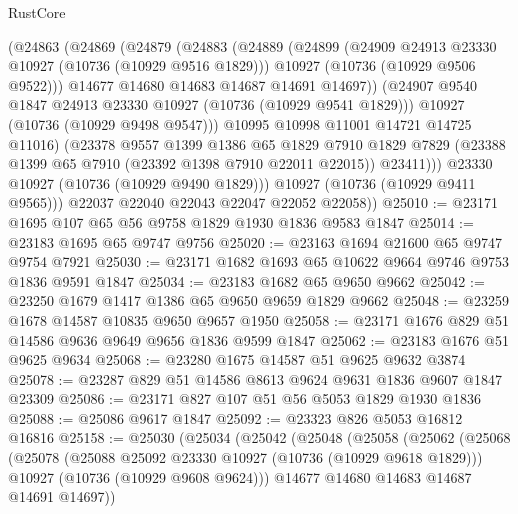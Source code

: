 \begin{lexlean}{RustCore}
\begin{coremodule}
              (@24863
                (@24869
                  (@24879
                    (@24883
                      (@24889
                        (@24899
                          (@24909 @24913 @23330 @10927 (@10736 (@10929 @9516 @1829)))
                          @10927
                          (@10736 (@10929 @9506 @9522)))
                        @14677
                        @14680
                        @14683
                        @14687
                        @14691
                        @14697))
                    (@24907 @9540 @1847 @24913 @23330 @10927 (@10736 (@10929 @9541 @1829)))
                    @10927
                    (@10736 (@10929 @9498 @9547)))
                  @10995
                  @10998
                  @11001
                  @14721
                  @14725
                  @11016)
                (@23378
                  @9557
                  @1399
                  @1386
                  @65
                  @1829
                  @7910
                  @1829
                  @7829
                  (@23388 @1399 @65 @7910 (@23392 @1398 @7910 @22011 @22015))
                  @23411)))
            @23330
            @10927
            (@10736 (@10929 @9490 @1829)))
          @10927
          (@10736 (@10929 @9411 @9565)))
        @22037
        @22040
        @22043
        @22047
        @22052
        @22058))
@25010 := @23171 @1695 @107 @65 @56 @9758 @1829 @1930 @1836 @9583 @1847
@25014 := @23183 @1695 @65 @9747 @9756
@25020 := @23163 @1694 @21600 @65 @9747 @9754 @7921
@25030 := @23171 @1682 @1693 @65 @10622 @9664 @9746 @9753 @1836 @9591 @1847
@25034 := @23183 @1682 @65 @9650 @9662
@25042 := @23250 @1679 @1417 @1386 @65 @9650 @9659 @1829 @9662
@25048 := @23259 @1678 @14587 @10835 @9650 @9657 @1950
@25058 := @23171 @1676 @829 @51 @14586 @9636 @9649 @9656 @1836 @9599 @1847
@25062 := @23183 @1676 @51 @9625 @9634
@25068 := @23280 @1675 @14587 @51 @9625 @9632 @3874
@25078 := @23287 @829 @51 @14586 @8613 @9624 @9631 @1836 @9607 @1847 @23309
@25086 := @23171 @827 @107 @51 @56 @5053 @1829 @1930 @1836
@25088 := @25086 @9617 @1847
@25092 := @23323 @826 @5053 @16812 @16816
@25158 := @25030
    (@25034
      (@25042
        (@25048
          (@25058
            (@25062
              (@25068
                (@25078
                  (@25088 @25092 @23330 @10927 (@10736 (@10929 @9618 @1829)))
                  @10927
                  (@10736 (@10929 @9608 @9624)))
                @14677
                @14680
                @14683
                @14687
                @14691
                @14697))

\end{coremodule}
\end{lexlean}
